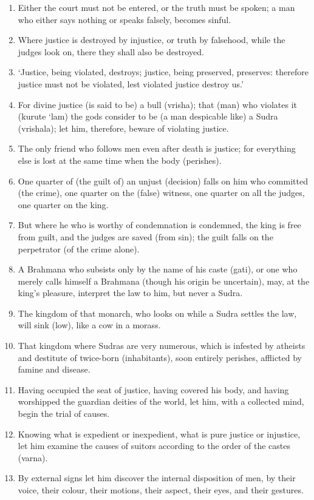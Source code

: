 \begin{enumerate}
\item Either the court must not be entered, or the truth must be spoken; a man who either says nothing or speaks falsely, becomes sinful.
\item Where justice is destroyed by injustice, or truth by falsehood, while the judges look on, there they shall also be destroyed.
\item `Justice, being violated, destroys; justice, being preserved, preserves: therefore justice must not be violated, lest violated justice destroy us.'
\item For divine justice (is said to be) a bull (vrisha); that (man) who violates it (kurute `lam) the gods consider to be (a man despicable like) a Sudra (vrishala); let him, therefore, beware of violating justice.
\item The only friend who follows men even after death is justice; for everything else is lost at the same time when the body (perishes).
\item One quarter of (the guilt of) an unjust (decision) falls on him who committed (the crime), one quarter on the (false) witness, one quarter on all the judges, one quarter on the king.
\item But where he who is worthy of condemnation is condemned, the king is free from guilt, and the judges are saved (from sin); the guilt falls on the perpetrator (of the crime alone).
\item A Brahmana who subsists only by the name of his caste (gati), or one who merely calls himself a Brahmana (though his origin be uncertain), may, at the king's pleasure, interpret the law to him, but never a Sudra.
\item The kingdom of that monarch, who looks on while a Sudra settles the law, will sink (low), like a cow in a morass.
\item That kingdom where Sudras are very numerous, which is infested by atheists and destitute of twice-born (inhabitants), soon entirely perishes, afflicted by famine and disease.
\item Having occupied the seat of justice, having covered his body, and having worshipped the guardian deities of the world, let him, with a collected mind, begin the trial of causes.
\item Knowing what is expedient or inexpedient, what is pure justice or injustice, let him examine the causes of suitors according to the order of the castes (varna).
\item By external signs let him discover the internal disposition of men, by their voice, their colour, their motions, their aspect, their eyes, and their gestures.

\end{enumerate}
